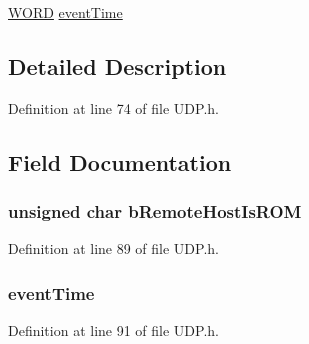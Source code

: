 \begin{DoxyCompactItemize}
\begin{tabbing}
\end{tabbing}\item 
\hyperlink{_generic_type_defs_8h_a2b0e863dadf920709ec53d9088ee7c91}{W\+O\+R\+D} \hyperlink{struct_u_d_p___s_o_c_k_e_t___i_n_f_o_a4194c8805edbad7a222ad28fd77487b6}{event\+Time}
\end{DoxyCompactItemize}


\subsection{Detailed Description}


Definition at line 74 of file U\+D\+P.\+h.



\subsection{Field Documentation}
\hypertarget{struct_u_d_p___s_o_c_k_e_t___i_n_f_o_a85e50d5129c9eaec6e4729cb5aacf312}{}
\subsubsection[{b\+Remote\+Host\+Is\+R\+O\+M}]{\setlength{\rightskip}{0pt plus 5cm}unsigned char b\+Remote\+Host\+Is\+R\+O\+M}\label{struct_u_d_p___s_o_c_k_e_t___i_n_f_o_a85e50d5129c9eaec6e4729cb5aacf312}


Definition at line 89 of file U\+D\+P.\+h.

\hypertarget{struct_u_d_p___s_o_c_k_e_t___i_n_f_o_a4194c8805edbad7a222ad28fd77487b6}{}
\subsubsection[{event\+Time}]{ event\+Time}\label{struct_u_d_p___s_o_c_k_e_t___i_n_f_o_a4194c8805edbad7a222ad28fd77487b6}


Definition at line 91 of file U\+D\+P.\+h.

